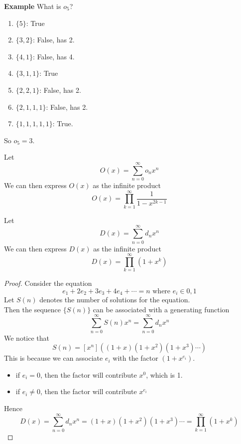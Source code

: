 \noindent\textbf{Example} What is $o_5$?
\begin{enumerate}
    \item $\{5\}$: True
    \item $\{3,2\}$: False, has 2.
    \item $\{4,1\}$: False, has 4.
    \item $\{3,1,1\}$: True
    \item $\{2,2,1\}$: False, has 2.
    \item $\{2,1,1,1\}$: False, has 2.
    \item $\{1,1,1,1,1\}$: True.
\end{enumerate}
So $o_5=3$.

\begin{theorem}
    Let $$O(x)=\sum_{n=0}^{\infty}o_nx^n$$
    We can then express $O(x)$ as the infinite product $$O(x)=\prod_{k=1}^{\infty}\frac{1}{1-x^{2k-1}}$$
\end{theorem}

\begin{theorem}
    Let $$D(x)=\sum_{n=0}^{\infty}d_nx^n$$
    We can then express $D(x)$ as the infinite product $$D(x)=\prod_{k=1}^{\infty}(1+x^k)$$
\end{theorem}
\begin{proof}
    Consider the equation $$e_1+2e_2+3e_3+4e_4+ \cdots=n \text{ where } e_i \in {0,1}$$
    Let $S(n)$ denotes the number of solutions for the equation. \\
    Then the sequence $\{S(n)\}$ can be associated with a generating function $$\sum_{n=0}^{\infty}S(n)x^n=\sum_{n=0}^{\infty}d_nx^n$$
    We notice that $$S(n)=[x^n]((1+x)(1+x^2)(1+x^3)\cdots)$$
    This is because we can associate $e_i$ with the factor $(1+x^{e_i})$.
    \begin{itemize}
        \item if $e_i=0$, then the factor will contribute $x^0$, which is 1.
        \item if $e_i \neq 0$, then the factor will contribute $x^{e_i}$
    \end{itemize}
    Hence $$D(x)=\sum_{n=0}^{\infty}d_nx^n=(1+x)(1+x^2)(1+x^3)\cdots=\prod_{k=1}^{\infty}(1+x^k)$$
\end{proof}

